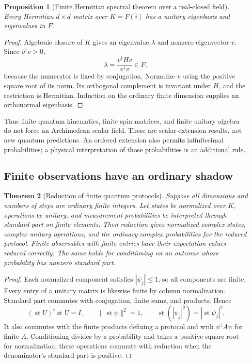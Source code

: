 \documentclass[11pt,a4paper]{article}
\numberwithin{equation}{section}
\newtheorem{theorem}{Theorem}[section]
\newtheorem{proposition}[theorem]{Proposition}
\theoremstyle{definition}
\theoremstyle{remark}
\DeclareMathOperator{\st}{st}
\begin{document}
\begin{proposition}[Finite Hermitian spectral theorem over a real-closed field]\label{prop:spectral}
Every Hermitian $d\times d$ matrix over $K=F(i)$ has a unitary eigenbasis and eigenvalues in $F$.
\end{proposition}
\begin{proof}
Algebraic closure of $K$ gives an eigenvalue $\lambda$ and nonzero eigenvector $v$. Since $v^\dagger v>0$,
\begin{equation}
 \lambda=\frac{v^\dagger Hv}{v^\dagger v}\in F,
\end{equation}
because the numerator is fixed by conjugation. Normalize $v$ using the positive square root of its norm. Its orthogonal complement is invariant under $H$, and the restriction is Hermitian. Induction on the ordinary finite dimension supplies an orthonormal eigenbasis.
\end{proof}

Thus finite quantum kinematics, finite spin matrices, and finite unitary algebra do not force an Archimedean scalar field. These are scalar-extension results, not new quantum predictions. An ordered extension also permits infinitesimal probabilities; a physical interpretation of those probabilities is an additional rule.

\subsection{Finite observations have an ordinary shadow}
\begin{theorem}[Reduction of finite quantum protocols]\label{thm:quantumreduction}
Suppose all dimensions and numbers of steps are ordinary finite integers. Let states be normalized over $K$, operations be unitary, and measurement probabilities be interpreted through standard part on finite elements. Then reduction gives normalized complex states, complex unitary operations, and the ordinary complex probabilities for the reduced protocol. Finite observables with finite entries have their expectation values reduced correctly. The same holds for conditioning on an outcome whose probability has nonzero standard part.
\end{theorem}
\begin{proof}
Each normalized component satisfies $|\psi_j|\leq1$, so all components are finite. Every entry of a unitary matrix is likewise finite by column normalization. Standard part commutes with conjugation, finite sums, and products. Hence
\begin{equation}
 (\st U)^\dagger\st U=I,\qquad
 \|\st\psi\|^2=1,\qquad
 \st(|\psi_j|^2)=|\st\psi_j|^2.
\end{equation}
It also commutes with the finite products defining a protocol and with $\psi^\dagger A\psi$ for finite $A$. Conditioning divides by a probability and takes a positive square root for normalization; these operations commute with reduction when the denominator's standard part is positive.
\end{proof}
\end{document}
